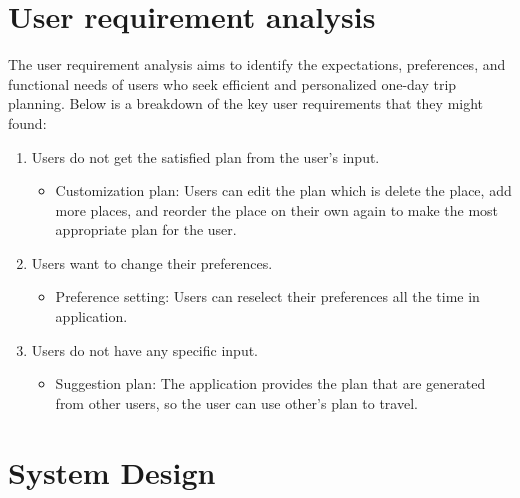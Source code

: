 \section{User requirement analysis}
The user requirement analysis aims to identify the expectations, preferences, and functional
needs of users who seek efficient and personalized one-day trip planning. Below is a breakdown
of the key user requirements that they might found:
\begin{enumerate}
    \item Users do not get the satisfied plan from the user’s input.
    \begin{itemize}
        \item Customization plan: Users can edit the plan which is delete the place, add more
        places, and reorder the place on their own again to make the most appropriate
        plan for the user.
    \end{itemize}
    \item Users want to change their preferences.
    \begin{itemize}
        \item Preference setting: Users can reselect their preferences all the time in application.
    \end{itemize}
    \item Users do not have any specific input.
    \begin{itemize}
        \item Suggestion plan: The application provides the plan that are generated from other
        users, so the user can use other’s plan to travel.
    \end{itemize}
\end{enumerate}
\newpage
\section{System Design}
